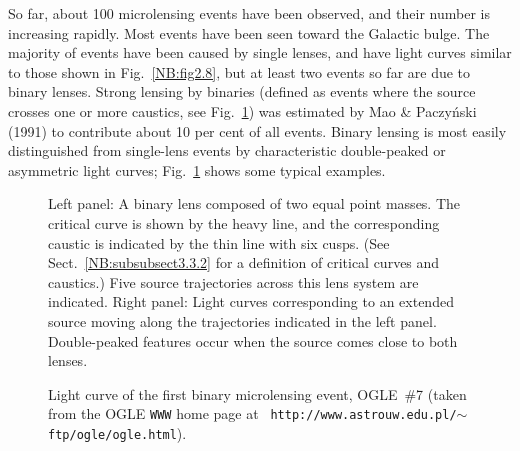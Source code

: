 \documentclass[a4paper,10pt]{article} %
\begin{document}
So far, about 100 microlensing events have been observed, and their
number is increasing rapidly. Most events have been seen toward the
Galactic bulge. The majority of events have been caused by single
lenses, and have light curves similar to those shown in Fig.\
\ref{NB:fig2.8}, but at least two events so far are due to binary
lenses. Strong lensing by binaries (defined as events where the source
crosses one or more caustics, see Fig.\ \ref{NB:fig2.9}) was estimated
by Mao \& Paczy\'nski (1991) to contribute about 10 per cent of all
events. Binary lensing is most easily distinguished from single-lens
events by characteristic double-peaked or asymmetric light curves;
Fig.\ \ref{NB:fig2.9} shows some typical examples.

\begin{figure}[ht] %
\begin{center}
\begin{minipage}[t]{0.45\hsize}
\end{minipage}
\begin{minipage}[t]{0.45\hsize}
\end{minipage}
\end{center}
\caption{Left panel: A binary lens composed of two equal point
  masses. The critical curve is shown by the heavy line, and the
  corresponding caustic is indicated by the thin line with six
  cusps. (See Sect.\ \protect\ref{NB:subsubsect3.3.2} for a definition
  of critical curves and caustics.) Five source trajectories across
  this lens system are indicated. Right panel: Light curves
  corresponding to an extended source moving along the trajectories
  indicated in the left panel. Double-peaked features occur when the
  source comes close to both lenses.}
\label{NB:fig2.9}
\end{figure}

\begin{figure}[ht] %
\begin{center}
\begin{minipage}[t]{0.9\hsize}
\end{minipage}
\end{center}
\caption{Light curve of the first binary microlensing event, OGLE~\#7
  (taken from the OGLE {\tt WWW} home page at {\tt
  http://www.astrouw.edu.pl/$\mathtt{\sim}$ftp/ogle/ogle.html}).}
\label{NB:fig2.10}
\end{figure}
\end{document}
